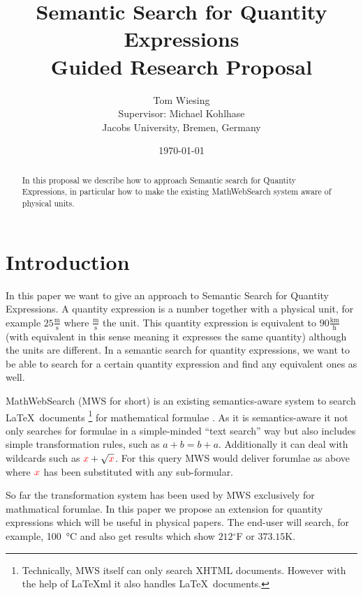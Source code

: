 \documentclass[11pt]{article}
\title{Semantic Search for Quantity Expressions\\ \vspace{2 mm} Guided Research Proposal}
\author{Tom Wiesing\\Supervisor: Michael Kohlhase\\Jacobs University, Bremen, Germany}
\date{\today}
\begin{document}
\maketitle

\begin{abstract}
  In this proposal we describe how to approach Semantic search for Quantity Expressions, in particular how to make the existing MathWebSearch system aware of physical units.
\end{abstract}

\section{Introduction}

In this paper we want to give an approach to Semantic Search for Quantity Expressions. A quantity expression is a number together with a physical unit, for example $25 \frac{\text{m}}{\text{s}}$ where $\frac{\text{m}}{\text{s}}$ the unit. This quantity expression is equivalent to $90 \frac{\text{km}}{\text{h}}$ (with equivalent in this sense meaning it expresses the same quantity) although the units are different. In a semantic search for quantity expressions, we want to be able to search for a certain quantity expression and find any equivalent ones as well.

MathWebSearch (MWS for short) is an existing semantics-aware system to search \LaTeX \  documents  \footnote{Technically, MWS itself can only search XHTML documents. However with the help of \LaTeX{}ml \cite{latexml-daemon} it also handles \LaTeX \  documents. } for mathematical formulae \cite{HamKohPro:man14}. As it is semantics-aware it not only searches for formulae in a simple-minded ``text search'' way but also includes simple transformation rules, such as $a + b = b + a$. Additionally it can deal with wildcards such as $ { \color{red} x} + \sqrt{\color{red} x}$. For this query MWS would deliver forumlae as above where $ { \color{red} x} $ has been substituted with any sub-formular.

So far the transformation system has been used by MWS exclusively for mathmatical forumlae. In this paper we propose an extension for quantity expressions which will be useful in physical papers.
The end-user will search, for example, \SI{100}{\degreeCelsius} and also get results which show $212$$^\circ$F or $373.15$K.
\end{document}
